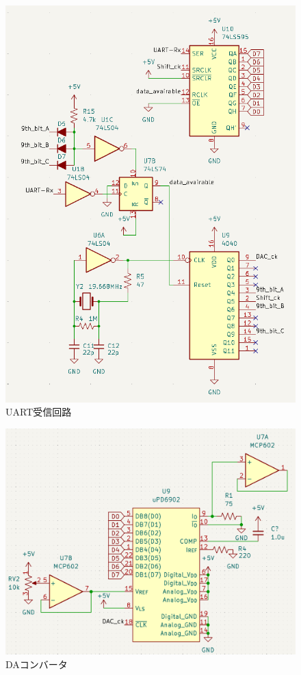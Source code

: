 \documentclass[a4paper,10pt]{article}
\begin{document}
\begin{multicols}{2}[\raggedcolumns]
\begin{figure}[H]
    \centering
    \includegraphics[width=\linewidth]{figure/uart_rx.png} 
    \caption{UART受信回路} 
    \label{fig:uart_rx}
\end{figure}

\begin{figure}[H]
    \centering
    \includegraphics[width=\linewidth]{figure/dac.png} 
    \caption{DAコンバータ} 
    \label{fig:dac}
\end{figure}


\end{multicols}
\end{document}
